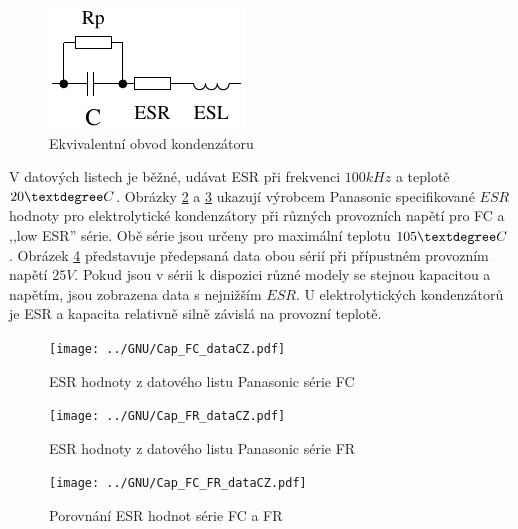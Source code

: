 \begin{figure}[H]
  \centering
    \includegraphics[width=.3\textwidth]{../FIG/Cap_equiv.pdf}
  \caption{Ekvivalentní obvod kondenzátoru}
  \label{fig:Cap_equiv}
\end{figure}

V datových listech je běžné, udávat ESR při frekvenci \(100kHz\) a teplotě \(20\textdegree C\).
Obrázky \ref{fig:Cap_FC_data} a \ref{fig:Cap_FR_data} ukazují výrobcem Panasonic
specifikované  \(ESR\) hodnoty pro elektrolytické kondenzátory při různých provozních napětí pro FC 
a ,,low ESR'' série. 
Obě série jsou určeny pro maximální teplotu \(105\textdegree C\).
Obrázek \ref{fig:Cap_FC_FR_data} představuje předepsaná data obou sérií při přípustném provozním napětí \(25V\). Pokud jsou v sérii k dispozici různé modely se stejnou kapacitou a napětím,
jsou zobrazena data s nejnižším \(ESR\).
U elektrolytických kondenzátorů je ESR a kapacita relativně silně závislá na provozní teplotě.

\begin{figure}[H]
  \centering
  \texttt{[image: ../GNU/Cap\_FC\_dataCZ.pdf]}
  \caption{ESR hodnoty z datového listu Panasonic série FC}
  \label{fig:Cap_FC_data}
\end{figure}

\begin{figure}[H]
  \centering
  \texttt{[image: ../GNU/Cap\_FR\_dataCZ.pdf]}
  \caption{ESR hodnoty z datového listu Panasonic série FR}
  \label{fig:Cap_FR_data}
\end{figure}

\begin{figure}[H]
  \centering
  \texttt{[image: ../GNU/Cap\_FC\_FR\_dataCZ.pdf]}
  \caption{Porovnání ESR hodnot série FC a FR}
  \label{fig:Cap_FC_FR_data}
\end{figure}

